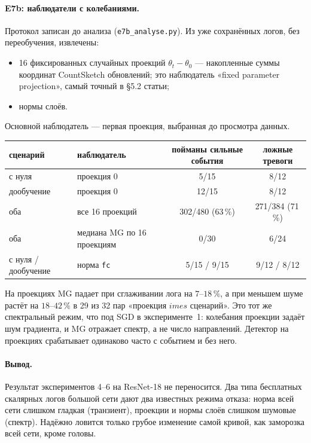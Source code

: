 \documentclass[10pt,a4paper]{article}
\newcommand{\bad}[1]{\textcolor[HTML]{BB5566}{#1}}
\begin{document}
\paragraph{E7b: наблюдатели с колебаниями.} Протокол записан до анализа
(\texttt{e7b\_analyse.py}). Из уже сохранённых логов, без переобучения, извлечены:
\begin{itemize}\setlength\itemsep{0pt}
\item 16 фиксированных случайных проекций $\theta_t-\theta_0$ --- накопленные суммы
  координат CountSketch обновлений; это наблюдатель «fixed parameter projection»,
  самый точный в §5.2 статьи;
\item нормы слоёв.
\end{itemize}
Основной наблюдатель --- первая проекция, выбранная до просмотра данных.
\begin{center}\small
\begin{tabular}{llcc}\toprule
сценарий & наблюдатель & пойманы сильные события & ложные тревоги\\\midrule
с нуля & проекция 0 & 5/15 & \bad{8/12}\\
дообучение & проекция 0 & 12/15 & \bad{8/12}\\
оба & все 16 проекций & 302/480 (63\,\%) & \bad{271/384 (71\,\%)}\\
оба & медиана MG по 16 проекциям & 0/30 & 6/24\\
с нуля / дообучение & норма \texttt{fc} & 5/15 / 9/15 & \bad{9/12 / 8/12}\\
\bottomrule\end{tabular}
\end{center}
На проекциях MG падает при сглаживании лога на $7$--$18\,\%$, а при меньшем шуме
растёт на $18$--$42\,\%$ в 29 из 32 пар «проекция $	imes$ сценарий». Это тот же спектральный режим, что под SGD в эксперименте~1:
колебания проекции задаёт шум градиента, и MG отражает спектр, а не число
направлений. Детектор на проекциях срабатывает одинаково часто с событием и без него.

\paragraph{Вывод.} Результат экспериментов 4--6 на ResNet-18 не переносится. Два типа
бесплатных скалярных логов большой сети дают два известных режима отказа: норма
всей сети слишком гладкая (транзиент), проекции и нормы слоёв слишком шумовые
(спектр). Надёжно ловится только грубое изменение самой кривой, как заморозка
всей сети, кроме головы.
\end{document}
